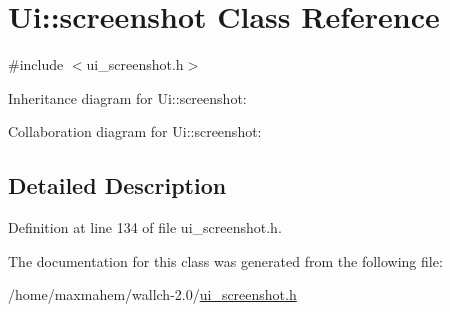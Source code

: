 \hypertarget{classUi_1_1screenshot}{
\section{Ui::screenshot Class Reference}
\label{classUi_1_1screenshot}
}


{\ttfamily \#include $<$ui\_\-screenshot.h$>$}



Inheritance diagram for Ui::screenshot:


Collaboration diagram for Ui::screenshot:


\subsection{Detailed Description}


Definition at line 134 of file ui\_\-screenshot.h.



The documentation for this class was generated from the following file:\begin{DoxyCompactItemize}
\item 
/home/maxmahem/wallch-\/2.0/\hyperlink{ui__screenshot_8h}{ui\_\-screenshot.h}\end{DoxyCompactItemize}
